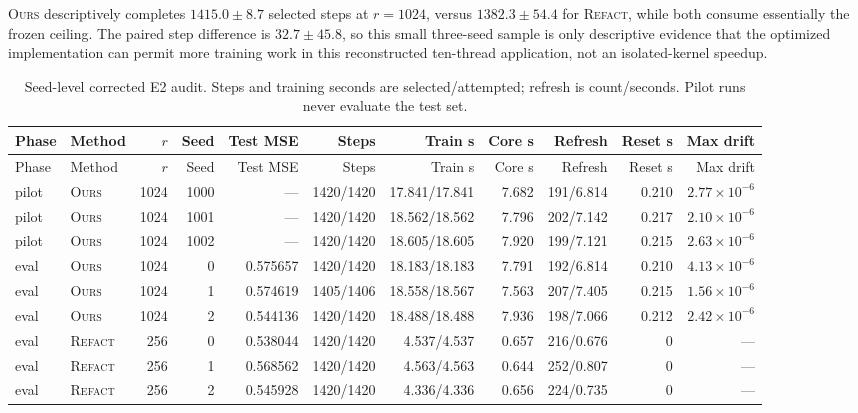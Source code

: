 \documentclass[11pt]{article}
\newcommand{\ours}{\textsc{Ours}}
\newcommand{\refact}{\textsc{Refact}}
\begin{document}
\ours{} descriptively completes \(1415.0\pm8.7\) selected steps at
\(r=1024\), versus
\(1382.3\pm54.4\) for \refact{}, while both consume essentially the frozen
ceiling.  The paired step difference is \(32.7\pm45.8\), so this small
three-seed sample is only descriptive evidence that the optimized
implementation can permit more training work in this reconstructed
ten-thread application, not an isolated-kernel speedup.

\begin{landscape}
{\scriptsize
\setlength{\tabcolsep}{2.4pt}
\begin{longtable}{@{}llrrrrrrrrr@{}}
\caption{Seed-level corrected E2 audit.  Steps and training seconds are
selected/attempted; refresh is count/seconds.  Pilot runs never evaluate the
test set.}
\label{tab:e2-seeds}\\
\toprule
Phase & Method & \(r\) & Seed & Test MSE & Steps & Train s & Core s &
Refresh & Reset s & Max drift \\
\midrule
\endfirsthead
\toprule
Phase & Method & \(r\) & Seed & Test MSE & Steps & Train s & Core s &
Refresh & Reset s & Max drift \\
\midrule
\endhead
pilot & \ours{} & 1024 & 1000 & --- & 1420/1420 & 17.841/17.841 &
  7.682 & 191/6.814 & 0.210 & \(2.77{\times}10^{-6}\) \\
pilot & \ours{} & 1024 & 1001 & --- & 1420/1420 & 18.562/18.562 &
  7.796 & 202/7.142 & 0.217 & \(2.10{\times}10^{-6}\) \\
pilot & \ours{} & 1024 & 1002 & --- & 1420/1420 & 18.605/18.605 &
  7.920 & 199/7.121 & 0.215 & \(2.63{\times}10^{-6}\) \\
\midrule
eval & \ours{} & 1024 & 0 & 0.575657 & 1420/1420 & 18.183/18.183 &
  7.791 & 192/6.814 & 0.210 & \(4.13{\times}10^{-6}\) \\
eval & \ours{} & 1024 & 1 & 0.574619 & 1405/1406 & 18.558/18.567 &
  7.563 & 207/7.405 & 0.215 & \(1.56{\times}10^{-6}\) \\
eval & \ours{} & 1024 & 2 & 0.544136 & 1420/1420 & 18.488/18.488 &
  7.936 & 198/7.066 & 0.212 & \(2.42{\times}10^{-6}\) \\
\midrule
eval & \refact{} & 256 & 0 & 0.538044 & 1420/1420 & 4.537/4.537 &
  0.657 & 216/0.676 & 0 & --- \\
eval & \refact{} & 256 & 1 & 0.568562 & 1420/1420 & 4.563/4.563 &
  0.644 & 252/0.807 & 0 & --- \\
eval & \refact{} & 256 & 2 & 0.545928 & 1420/1420 & 4.336/4.336 &
  0.656 & 224/0.735 & 0 & --- \\

\end{longtable}}
\end{landscape}
\end{document}
